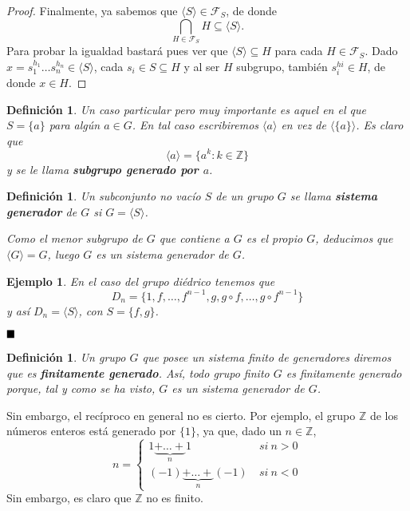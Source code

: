 \documentclass[12pt]{article}
\newtheorem{definition}[theorem]{Definición}
\newtheorem{example}{Ejemplo}[theorem]
\begin{document}
\begin{proof}
Finalmente, ya sabemos que $\langle S \rangle \in \mathcal{F}_S$, de donde $$ \bigcap_{H \in \mathcal{F}_S} H \subseteq \langle S \rangle.$$ Para probar la igualdad bastará pues ver que $\langle S \rangle \subseteq H$ para cada $H \in \mathcal{F}_S$. Dado $x = s_1^{h_1} \ldots s_n^{h_n} \in \langle S \rangle$, cada $s_i \in S \subseteq H$ y al ser $H$ subgrupo, también $s_i^{hi} \in H$, de donde $x \in H$.

\end{proof}

\begin{definition} Un caso particular pero muy importante es aquel en el que $S = \lbrace a \rbrace$ para algún $a \in G$. En tal caso escribiremos $\langle a \rangle$ en vez de $\langle \lbrace a \rbrace \rangle$. Es claro que $$ \langle a \rangle = \lbrace a^k : k \in \mathbb{Z} \rbrace$$ y se le llama \textbf{subgrupo generado por $a$}.
\end{definition}

\begin{definition} Un subconjunto no vacío $S$ de un grupo $G$ se llama \textbf{sistema generador} de $G$ si $G  =\langle S \rangle$.

Como el menor subgrupo de $G$ que contiene a $G$ es el propio $G$, deducimos que $\langle G \rangle = G$, luego $G$ es un sistema generador de $G$.
\end{definition}

\begin{example}En el caso del grupo diédrico tenemos que $$D_n = \lbrace 1, f, \ldots, f^{n-1}, g, g \circ f, \ldots, g \circ f^{n-1}\rbrace$$ y así $D_n = \langle S \rangle$, con $S = \lbrace f,g \rbrace$.
\end{example}

$\hfill \blacksquare$

\begin{definition}Un grupo $G$ que posee un sistema finito de generadores diremos que es \textbf{finitamente generado}. Así, todo grupo finito $G$ es finitamente generado porque, tal y como se ha visto, $G$ es un sistema generador de $G$.
\end{definition}

Sin embargo, el recíproco en general no es cierto. Por ejemplo, el grupo $\mathbb{Z}$ de los números enteros está generado por $\lbrace 1 \rbrace$, ya que, dado un $n \in \mathbb{Z}$, 
$$
n = \left\{
    \begin{array}{ll}
       1 \underbrace{+ \ldots +}_n1&~si~ n>0 \\
       	(-1) \underbrace{+ \ldots + }_n (-1)&~si~ n<0
    \end{array}
\right.
$$ 
Sin embargo, es claro que $\mathbb{Z}$ no es finito.
\end{document}
